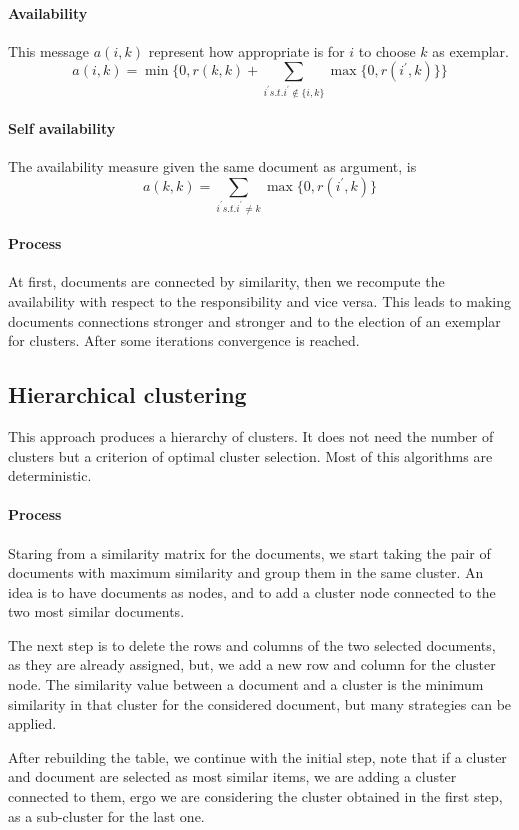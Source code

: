 \paragraph{Availability}
This message $a(i, k)$ represent how appropriate is for $i$ to choose 
$k$ as exemplar.
$$a(i, k) = \min \bigg\{ 0, r(k, k) + \sum_{i^\prime s.t.i^\prime \notin \{i, k\}} \max\{0, r(i^\prime, k)\}\bigg\}$$

\paragraph{Self availability}
The availability measure given the same document as argument, is 
$$a(k, k) = \sum_{i^\prime s.t.i^\prime \neq k} \max\{0, r(i^\prime, k)\}$$

\paragraph{Process}
At first, documents are connected by similarity, then we recompute the availability 
with respect to the responsibility and vice versa. This leads to making documents 
connections stronger and stronger and to the election of an exemplar for clusters.
After some iterations convergence is reached.

\subsection{Hierarchical clustering}
This approach produces a hierarchy of clusters. It does not need the number of clusters 
but a criterion of optimal cluster selection. Most of this algorithms are deterministic.

\paragraph{Process}
Staring from a similarity matrix for the documents, we start taking the pair 
of documents with maximum similarity and group them in the same cluster. 
An idea is to have documents as nodes, and to add a cluster node connected 
to the two most similar documents.

The next step is to delete the rows and columns of the two selected documents, 
as they are already assigned, but, we add a new row and column 
for the cluster node.
The similarity value between a document and a cluster is the minimum similarity 
in that cluster for the considered document, but many strategies can be applied.

After rebuilding the table, we continue with the initial step, 
note that if a cluster and document are selected as most similar items, 
we are adding a cluster connected to them, ergo we are considering the cluster 
obtained in the first step, as a sub-cluster for the last one.

